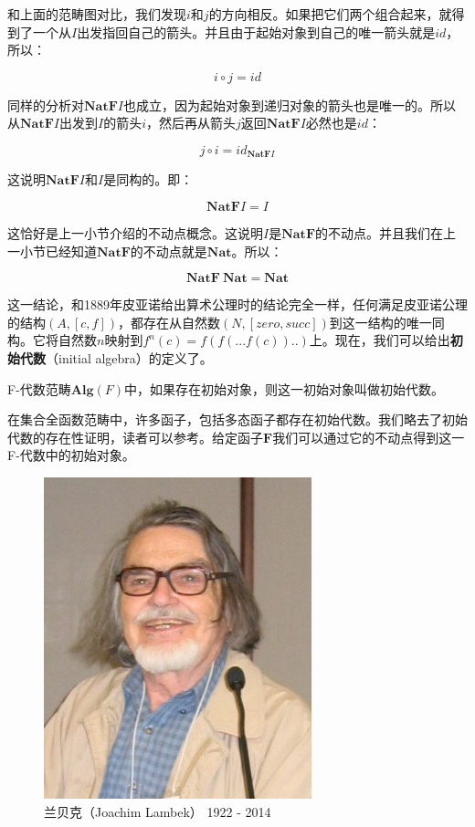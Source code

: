 \documentclass[b5paper]{ctexart}
\begin{document}
和上面的范畴图对比，我们发现$i$和$j$的方向相反。如果把它们两个组合起来，就得到了一个从$I$出发指回自己的箭头。并且由于起始对象到自己的唯一箭头就是$id$，所以：

\[
i \circ j = id
\]

同样的分析对$\mathbf{NatF}I$也成立，因为起始对象到递归对象的箭头也是唯一的。所以从$\mathbf{NatF}I$出发到$I$的箭头$i$，然后再从箭头$j$返回$\mathbf{NatF}I$必然也是$id$：

\[
j \circ i = id_{\mathbf{NatF}I}
\]

这说明$\mathbf{NatF}I$和$I$是同构的。即：

\[
  \mathbf{NatF} I = I
\]

这恰好是上一小节介绍的不动点概念。这说明$I$是$\mathbf{NatF}$的不动点。并且我们在上一小节已经知道$\mathbf{NatF}$的不动点就是$\mathbf{Nat}$。所以：

\[
  \mathbf{NatF}\ \mathbf{Nat} = \mathbf{Nat}
\]

这一结论，和1889年皮亚诺给出算术公理时的结论完全一样，任何满足皮亚诺公理的结构$(A, [c, f])$，都存在从自然数$(N, [zero, succ])$到这一结构的唯一同构。它将自然数$n$映射到$f^n(c) = f(f(...f(c))..)$上。现在，我们可以给出\textbf{初始代数}（initial algebra）的定义了。

\begin{definition}
F-代数范畴$\pmb{Alg}(F)$中，如果存在初始对象，则这一初始对象叫做初始代数。
\end{definition}

在集合全函数范畴中，许多函子，包括多态函子都存在初始代数。我们略去了初始代数的存在性证明，读者可以参考\cite{Manes-Arbib-1986}。给定函子$\mathbf{F}$我们可以通过它的不动点得到这一F-代数中的初始对象。

\begin{figure}[htbp]
 \centering
 \includegraphics[scale=0.4]{img/Lambek.jpg}
 \captionsetup{labelformat=empty}
 \caption{兰贝克（Joachim Lambek） 1922 - 2014}
 \label{fig:Lambek}
\end{figure}
\end{document}
